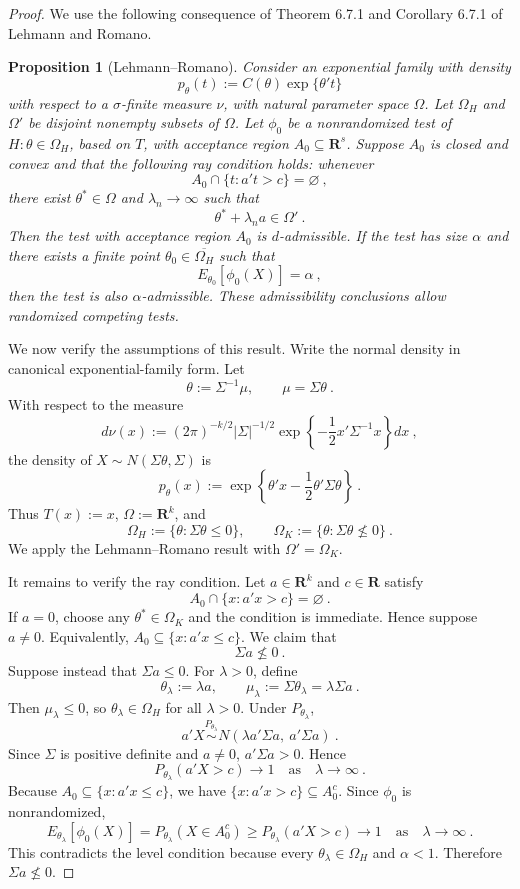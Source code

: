 \documentclass[12pt]{article}
\newtheorem{proposition}{Proposition}
\theoremstyle{definition}
\theoremstyle{remark}
\begin{document}
\begin{proof}
We use the following consequence of Theorem 6.7.1 and Corollary 6.7.1 of Lehmann and Romano.

\begin{proposition}[Lehmann--Romano]
Consider an exponential family with density
\[
p_\theta(t):=C(\theta)\exp\{\theta't\}
\]
with respect to a $\sigma$-finite measure $\nu$, with natural parameter space $\Omega$. Let $\Omega_H$ and $\Omega'$ be disjoint nonempty subsets of $\Omega$. Let $\phi_0$ be a nonrandomized test of $H:\theta\in\Omega_H$, based on $T$, with acceptance region $A_0\subseteq\mathbf R^s$. Suppose $A_0$ is closed and convex and that the following ray condition holds: whenever
\[
A_0\cap\{t:a't>c\}=\varnothing~,
\]
there exist $\theta^*\in\Omega$ and $\lambda_n\to\infty$ such that
\[
\theta^*+\lambda_n a\in\Omega'~.
\]
Then the test with acceptance region $A_0$ is $d$-admissible. If the test has size $\alpha$ and there exists a finite point $\theta_0\in\overline{\Omega_H}$ such that
\[
E_{\theta_0}[\phi_0(X)]=\alpha~,
\]
then the test is also $\alpha$-admissible. These admissibility conclusions allow randomized competing tests.
\end{proposition}

We now verify the assumptions of this result. Write the normal density in canonical exponential-family form. Let
\[
\theta :=\Sigma^{-1}\mu,
\qquad
\mu=\Sigma\theta~.
\]
With respect to the measure
\[
d\nu(x):=(2\pi)^{-k/2}|\Sigma|^{-1/2}
\exp\left\{-\frac12 x'\Sigma^{-1}x\right\}dx~,
\]
the density of $X\sim N(\Sigma\theta,\Sigma)$ is
\[
p_\theta(x):=\exp\left\{\theta'x-\frac12\theta'\Sigma\theta\right\}~.
\]
Thus $T(x):=x$, $\Omega:=\mathbf R^k$, and
\[
\Omega_H:=\{\theta:\Sigma\theta\le 0\},
\qquad
\Omega_K:=\{\theta:\Sigma\theta\not\le 0\}~.
\]
We apply the Lehmann--Romano result with $\Omega'=\Omega_K$.

It remains to verify the ray condition. Let $a\in\mathbf R^k$ and $c\in\mathbf R$ satisfy
\[
A_0\cap\{x:a'x>c\}=\varnothing~.
\]
If $a=0$, choose any $\theta^*\in\Omega_K$ and the condition is immediate.  Hence suppose $a\ne 0$. Equivalently, $A_0\subseteq\{x:a'x\le c\}$. We claim that
\[
\Sigma a\not\le 0~.
\]
Suppose instead that $\Sigma a\le 0$. For $\lambda>0$, define
\[
\theta_\lambda :=\lambda a,
\qquad
\mu_\lambda :=\Sigma\theta_\lambda=\lambda\Sigma a~.
\]
Then $\mu_\lambda\le 0$, so $\theta_\lambda\in\Omega_H$ for all $\lambda>0$. Under $P_{\theta_\lambda}$,
\[
a'X \stackrel{P_{\theta_\lambda}}{\sim} N\left(\lambda a'\Sigma a,\ a'\Sigma a\right)~.
\]
Since $\Sigma$ is positive definite and $a\ne 0$, $a'\Sigma a>0$. Hence
\[
P_{\theta_\lambda}(a'X>c)\to 1 \quad \text{as} \quad \lambda\to\infty~.
\]
Because $A_0\subseteq\{x:a'x\le c\}$, we have $\{x:a'x>c\}\subseteq A_0^c$. Since $\phi_0$ is nonrandomized,
\[
E_{\theta_\lambda}[\phi_0(X)] = P_{\theta_\lambda}(X\in A_0^c)
\ge P_{\theta_\lambda}(a'X>c)
\to 1 \quad \text{as} \quad \lambda\to\infty~.
\]
This contradicts the level condition because every $\theta_\lambda\in\Omega_H$ and $\alpha<1$. Therefore $\Sigma a\not\le 0$.


\end{proof}
\end{document}
